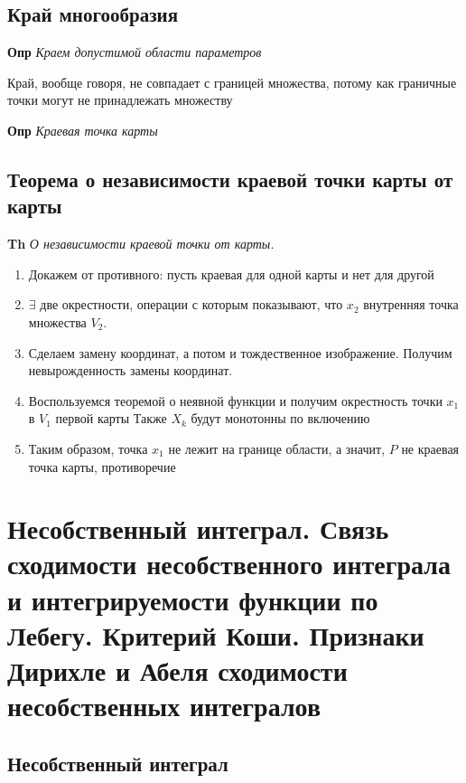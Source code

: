 \documentclass[a4paper, 14pt]{article}
\begin{document}
    \subsection{Край многообразия}
    
    \textbf{Опр} \textit{Краем допустимой области параметров}
    
    Край, вообще говоря, не совпадает с границей множества, потому как граничные точки могут не принадлежать множеству
    
    \textbf{Опр} \textit{Краевая точка карты}
    
    \subsection{Теорема о независимости краевой точки карты от карты}
    
    \textbf{Th} \textit{О независимости краевой точки от карты.}
    
    \begin{enumerate}
        \item Докажем от противного: пусть краевая для одной карты и нет для другой
        \item $\exists$ две окрестности, операции с которым показывают, что $x_2$ внутренняя точка множества $V_2$.
        \item Сделаем замену координат, а потом и тождественное изображение.
        Получим невырожденность замены координат.
        \item Воспользуемся теоремой о неявной функции и получим окрестность точки $x_1$ в $V_1$ первой карты
        Также $X_k$ будут монотонны по включению
        \item Таким образом, точка $x_1$ не лежит на границе области, а значит, $P$ не краевая точка карты, противоречие
    \end{enumerate}
    
    \section{Несобственный интеграл.
    Связь сходимости несобственного интеграла и интегрируемости функции по Лебегу.
    Критерий Коши.
    Признаки Дирихле и Абеля сходимости несобственных интегралов}
    
    \subsection{Несобственный интеграл}
    
\end{document}
